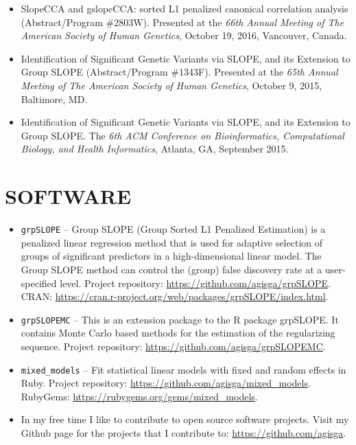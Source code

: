 \documentclass[margin]{res} %
\begin{document}
\begin{resume}
\begin{itemize} \itemsep -2pt %
  \item SlopeCCA and gslopeCCA: sorted L1 penalized canonical correlation analysis (Abstract/Program \#2803W). Presented at the {\it 66th Annual Meeting of The American Society of Human Genetics}, October 19, 2016, Vancouver, Canada.
  \item Identification of Significant Genetic Variants via SLOPE, and its Extension to Group SLOPE (Abstract/Program \#1343F). Presented at the {\it 65th Annual Meeting of The American Society of Human Genetics}, October 9, 2015, Baltimore, MD.
  \item Identification of Significant Genetic Variants via SLOPE, and its Extension to Group SLOPE. The {\it 6th ACM Conference on Bioinformatics, Computational Biology, and Health Informatics}, Atlanta, GA, September 2015.
\end{itemize}


\section{SOFTWARE}

\begin{itemize} \itemsep -2pt %
    \item \verb!grpSLOPE! -- Group SLOPE (Group Sorted L1 Penalized Estimation) is a penalized linear regression method that is used for adaptive selection of groups of significant predictors in a high-dimensional linear model. The Group SLOPE method can control the (group) false discovery rate at a user-specified level. Project repository: \url{https://github.com/agisga/grpSLOPE}. CRAN: \url{https://cran.r-project.org/web/packages/grpSLOPE/index.html}.
    \item \verb!grpSLOPEMC! -- This is an extension package to the R package grpSLOPE. It contains Monte Carlo based methods for the estimation of the regularizing sequence. Project repository: \url{https://github.com/agisga/grpSLOPEMC}.
    \item \verb!mixed_models! -- Fit statistical linear models with fixed and random effects in Ruby. Project repository: \url{https://github.com/agisga/mixed_models}. RubyGems: \url{https://rubygems.org/gems/mixed_models}.
    \item In my free time I like to contribute to open source software projects. Visit my Github page for the projects that I contribute to: \url{https://github.com/agisga}.
\end{itemize}


\end{resume}
\end{document}
